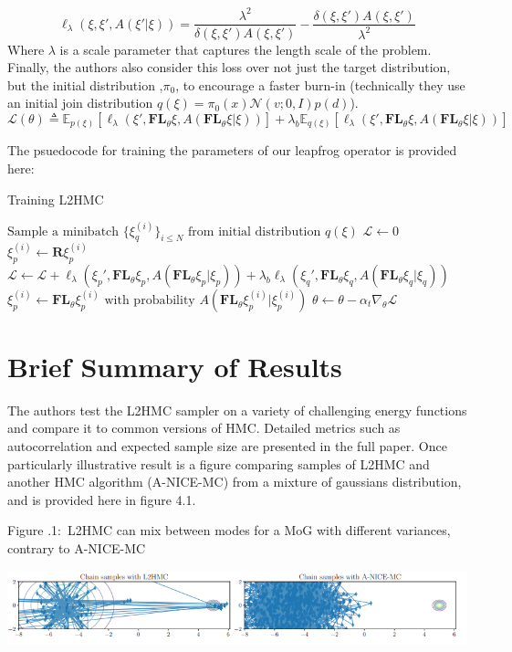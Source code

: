 \documentclass[twoside]{article}
\newcounter{lecnum}
\newcommand{\fig}[3]{
			\vspace{#2}
			\begin{center}
			Figure \thelecnum.#1:~#3
			\end{center}
	}
\begin{document}
\begin{equation}
    \ell_{\lambda} (\xi, \xi', A(\xi'|\xi)) = \frac{\lambda^2}{\delta(\xi,\xi')A(\xi,\xi')} -\frac{\delta(\xi,\xi')A(\xi,\xi')}{\lambda^2}
\end{equation}
Where $\lambda$ is a scale parameter that captures the length scale of the problem. Finally, the authors also consider this loss over not just the target distribution, but the initial distribution ,$\pi_0$, to encourage a faster burn-in (technically they use an initial join distribution $q(\xi) = \pi_0(x)\mathcal{N}(v;0,I)p(d)$).
\begin{equation}
    \mathcal{L}(\theta) \triangleq \mathbb{E}_{p(\xi)}[\ell_{\lambda}(\xi', \textbf{FL}_\theta \xi, A(\textbf{FL}_\theta \xi | \xi))] + \lambda_b \mathbb{E}_{q(\xi)}[\ell_{\lambda}(\xi', \textbf{FL}_\theta \xi, A(\textbf{FL}_\theta \xi | \xi))]
\end{equation}

The psuedocode for training the parameters of our leapfrog operator is provided here:

\begin{algorithm}[H]
\caption{Training L2HMC}
\label{L2HMCalgorithm}
\begin{algorithmic}[1]
    \State $\text{Sample a minibatch } \{ \xi_q^{(i)} \}_{i\leq N}  \text{ from initial distribution } q(\xi) $
    \State $\mathcal{L} \leftarrow 0$
        \State $\xi_p^{(i)} \leftarrow \textbf{R}\xi_p^{(i)}$
        \State $\mathcal{L} \leftarrow \mathcal{L} + \ell_{\lambda}(\xi_p', \textbf{FL}_\theta \xi_p, A(\textbf{FL}_\theta \xi_p | \xi_p)) + \lambda_b \ell_{\lambda}(\xi_q', \textbf{FL}_\theta \xi_q, A(\textbf{FL}_\theta \xi_q | \xi_q)) $
        \State $\xi_p^{(i)} \leftarrow \textbf{FL}_\theta \xi_p^{(i)} \text{ with probability } A(\textbf{FL}_\theta \xi_p^{(i)}|\xi_p^{(i)})$
    \EndFor
    \State $\theta \leftarrow \theta - \alpha_t \nabla_\theta \mathcal{L}$
\EndFor
\end{algorithmic}
\end{algorithm}


\section{Brief Summary of Results}
The authors test the L2HMC sampler on a variety of challenging energy functions and compare it to common versions of HMC. Detailed metrics such as autocorrelation and expected sample size are presented in the full paper. Once particularly illustrative result is a figure comparing samples of L2HMC and another HMC algorithm (A-NICE-MC) from a mixture of gaussians distribution, and is provided here in figure 4.1.


\fig{1}{0.2in}{L2HMC can mix between modes for a MoG with different variances, contrary to A-NICE-MC}
\includegraphics[width=\textwidth]{L2HMC-results.PNG}










\end{document}
